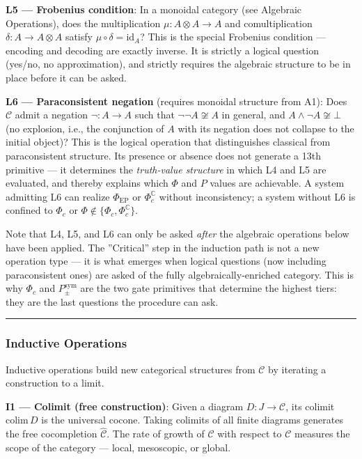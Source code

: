 \documentclass[12pt,a4paper]{article}
\begin{document}
\textbf{L5 --- Frobenius condition}: In a monoidal category (see Algebraic Operations), does the multiplication $\mu: A \otimes A \to A$ and comultiplication $\delta: A \to A \otimes A$ satisfy $\mu \circ \delta = \text{id}_A$? This is the special Frobenius condition --- encoding and decoding are exactly inverse. It is strictly a logical question (yes/no, no approximation), and strictly requires the algebraic structure to be in place before it can be asked.

\textbf{L6 --- Paraconsistent negation} (requires monoidal structure from A1): Does $\mathcal{C}$ admit a negation $\neg: A \to A$ such that $\neg\neg A \not\cong A$ in general, and $A \wedge \neg A \not\cong \bot$ (no explosion, i.e., the conjunction of $A$ with its negation does not collapse to the initial object)? This is the logical operation that distinguishes classical from paraconsistent structure. Its presence or absence does not generate a 13th primitive --- it determines the \emph{truth-value structure} in which L4 and L5 are evaluated, and thereby explains which $\Phi$ and $P$ values are achievable. A system admitting L6 can realize $\Phi_\text{EP}$ or $\Phi_c^\mathbb{C}$ without inconsistency; a system without L6 is confined to $\Phi_c$ or $\Phi \notin \{\Phi_c, \Phi_c^\mathbb{C}\}$.

Note that L4, L5, and L6 can only be asked \emph{after} the algebraic operations below have been applied. The ''Critical'' step in the induction path is not a new operation type --- it is what emerges when logical questions (now including paraconsistent ones) are asked of the fully algebraically-enriched category. This is why $\Phi_c$ and $P_{\pm}^{\text{sym}}$ are the two gate primitives that determine the highest tiers: they are the last questions the procedure can ask.

\begin{center}
\rule{0.5\textwidth}{0.4pt}
\end{center}

\subsubsection{Inductive Operations}

Inductive operations build new categorical structures from $\mathcal{C}$ by iterating a construction to a limit.

\textbf{I1 --- Colimit (free construction)}: Given a diagram $D: J \to \mathcal{C}$, its colimit $\text{colim}\, D$ is the universal cocone. Taking colimits of all finite diagrams generates the free cocompletion $\hat{\mathcal{C}}$. The rate of growth of $\hat{\mathcal{C}}$ with respect to $\mathcal{C}$ measures the scope of the category --- local, mesoscopic, or global.
\end{document}
